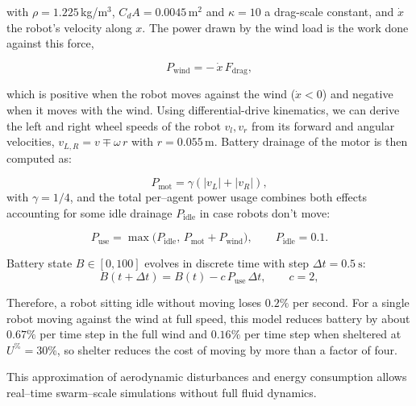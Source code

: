 \documentclass[runningheads]{llncs}
\begin{document}
with $\rho = 1.225$\,kg/m$^3$, $C_dA = 0.0045$\,m$^2$ and $\kappa = 10$ a drag-scale constant, and $\dot{x}$ the robot's velocity along $x$. The power drawn by the wind load is the work done against this force,

\begin{equation}
P_{\text{wind}} = -\,\dot{x}\,F_{\text{drag}},
\label{eq:pwind_compact}
\end{equation}

which is positive when the robot moves against the wind ($\dot{x} < 0$) and negative when it moves with the wind. Using differential-drive kinematics, we can derive the left and right wheel speeds of the robot $v_l, v_r$ from its forward and angular velocities, $v_{L,R} = v \mp \omega\, r$ with $r = 0.055$\,m. Battery drainage of the motor is then computed as:

\begin{equation}
P_{\text{mot}} = \gamma(|v_L| + |v_R|),
\label{eq:pmot_compact}
\end{equation}
with $\gamma = 1/4$, and the total per–agent power usage combines both effects accounting for some idle drainage $P_{\text{idle}}$ in case robots don't move:

\begin{equation}
P_{\text{use}} = \max\!\big(P_{\text{idle}},\, P_{\text{mot}} + P_{\text{wind}}\big),
\qquad P_{\text{idle}} = 0.1.
\label{eq:puse_compact}
\end{equation}

Battery state $B\in[0,100]$ evolves in discrete time with step
$\Delta t=0.5~\text{s}$:
\begin{equation}
B(t+\Delta t)=B(t)-c\,P_{\text{use}}\,\Delta t, \qquad c = 2,
\label{eq:battery_compact}
\end{equation}

Therefore, a robot sitting idle without moving loses $0.2\%$ per second. For a single robot moving against the wind at full speed, this model reduces battery by about $0.67\%$ per time step in the full wind and $0.16\%$ per time step when sheltered at $U^\% = 30\%$, so shelter reduces the cost of moving by more than a factor of four.

This approximation of aerodynamic disturbances and energy consumption allows real–time swarm–scale simulations without full fluid dynamics. 
\end{document}
